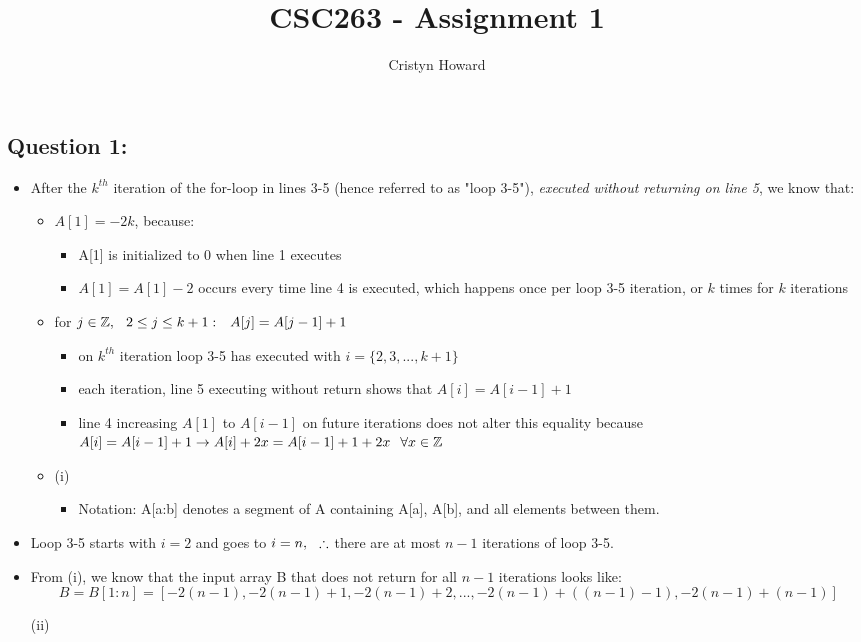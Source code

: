 \documentclass[12pt, oneside]{article}
\title{CSC263 - Assignment 1}
\author{Cristyn Howard}
\newcommand\tab[1][0.25cm]{\hspace*{#1}}
\newcommand\imp{\rightarrow}
\begin{document}
\maketitle

\subsection*{Question 1:}

\begin{itemize}
\item After the $k^{th}$ iteration of the for-loop in lines 3-5 (hence referred to as "loop 3-5"), \emph{executed without returning on line 5}, we know that:
	\begin{itemize}
	\item $A[1] = -2k$, because:
		\begin{itemize}
		\item A[1] is initialized to 0 when line 1 executes
		\item $A[1] = A[1]-2$ occurs every time line 4 is executed, which happens once per loop 3-5 iteration, or $k$ times for $k$ iterations
		\end{itemize}
	\item for $j \in \mathbb{Z},\tab	2 \leq j \leq k+1:\tab	A[j] = A[j-1]+1$
		\begin{itemize}
		\item on $k^{th}$ iteration loop 3-5 has executed with $i = \{2, 3, ..., k+1\}$
		\item each iteration, line 5 executing without return shows that $A[i] = A[i-1]+1$
		\item line 4 increasing $A[1]$ to $A[i-1]$ on future iterations does not alter this equality because $A[i] = A[i-1]+1 \imp A[i]+2x = A[i-1]+1+2x \tab \forall x \in \mathbb{Z}$
		\end{itemize}
	\item (i) \framebox{$\therefore \tab A[1:k+1] = [-2k, -2k+1, -2k+2, ..., -2k+(k-1), -2k+k]$}
		\begin{itemize}
		\item Notation: A[a:b] denotes a segment of A containing A[a], A[b], and all elements between them. 
		\end{itemize}
	\end{itemize}
	
\item Loop 3-5 starts with $i=2$ and goes to $i=n,\tab \therefore$ there are at most $n-1$ iterations of loop 3-5.

\item From (i), we know that the input array B that does not return for all $n-1$ iterations looks like:
	$$ B= B[1:n] = [-2(n-1), -2(n-1)+1, -2(n-1)+2, ..., -2(n-1)+((n-1)-1), -2(n-1)+(n-1)] $$
	\begin{center} (ii)  \end{center}
	

\end{itemize}
\end{document}
